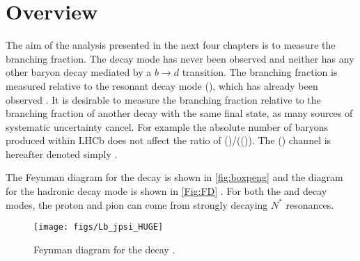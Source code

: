 \section{Overview}
\label{sec:overview}
The aim of the analysis presented in the next four chapters is to measure the \Lbpi branching fraction. The \Lbpi decay mode has never been observed and neither has any other baryon decay mediated by a $b\to d$ transition. The \Lbpi branching fraction is measured relative to the resonant decay mode \Lb\to\proton\pim\jpsi(\to\mumu), which has already been observed \cite{LHCb-PAPER-2014-020}. It is desirable to measure the branching fraction relative to the branching fraction of another decay with the same final state, as many sources of systematic uncertainty cancel. For example the absolute number of \Lb baryons produced within LHCb does not affect the ratio of \BF(\Lbpi)/\BF(\Lb\to\proton\pim\jpsi(\to\mumu)). The \Lb\to\proton\pim\jpsi(\to\mumu) channel is hereafter denoted simply \Lbpijpsi. %

The Feynman diagram for the \Lbpi decay is shown in \autoref{fig:boxpeng}\protect{} and the diagram for the hadronic decay mode \Lbpijpsi is shown in \autoref{Fig:FD} .  For both the \Lbpi and \Lbpijpsi decay modes, the proton and pion can come from strongly decaying $N^{*}$ resonances.

\begin{figure}[!ht]%
  \centering
    \texttt{[image: figs/Lb\_jpsi\_HUGE]}%
    \caption{Feynman diagram for the decay \Lbpijpsi.}
  \label{Fig:FD}
\end{figure}

